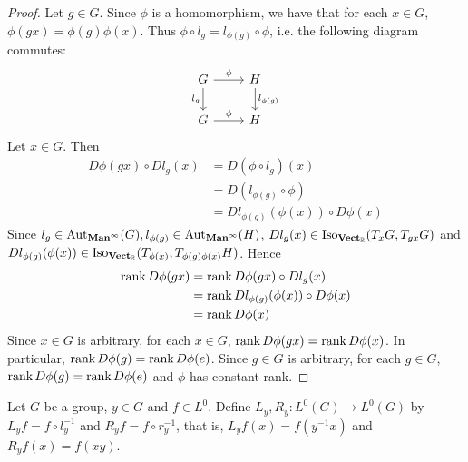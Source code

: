 \documentclass{book}
\begin{document}
\begin{proof}
	Let $g \in G$. Since $\phi$ is a homomorphism, we have that for each $x \in G$, $\phi(g x) = \phi(g) \phi(x)$. Thus $\phi \circ l_g = l_{\phi(g)} \circ \phi$, i.e. the following diagram commutes: 
	\[ 
	\begin{tikzcd}
		G \arrow[r, "\phi"] \arrow[d, "l_g"'] & H \arrow[d, "l_{\phi(g)}"]  \\
		G \arrow[r, "\phi"]                   & H
	\end{tikzcd}
	\]
	Let $x \in G$. Then
	\begin{align*}
		D\phi(gx) \circ D l_g (x) 
		& = D(\phi \circ l_g) (x) \\
		& = D(l_{\phi(g)} \circ \phi) \\
		& = D l_{\phi(g)} (\phi(x)) \circ D \phi (x) 
	\end{align*}
	Since $l_g \in \operatorname{Aut}_{\operatorname*{\text{\textbf{Man}}^{\infty}}}(G), l_{\phi(g)} \in \operatorname{Aut}_{\operatorname*{\text{\textbf{Man}}^{\infty}}}(H)$, $D l_g (x) \in \operatorname{Iso}_{\operatorname*{\text{\textbf{Vect}}_{\mathbb{R}}}}(T_x G, T_{g x} G)$ and $D l_{\phi(g)}(\phi(x)) \in \operatorname{Iso}_{\operatorname*{\text{\textbf{Vect}}_{\mathbb{R}}}}(T_{\phi(x)}, T_{\phi(g) \phi(x)}H)$. Hence 
	\begin{align*}
		\operatorname{\text{rank}} D\phi(gx)
		& = \operatorname{\text{rank}} D\phi(gx) \circ D l_g (x) \\
		& = \operatorname{\text{rank}} D l_{\phi(g)} (\phi(x)) \circ D \phi (x) \\
		& = \operatorname{\text{rank}}  D \phi (x)
	\end{align*} 
	Since $x \in G$ is arbitrary, for each $x \in G$, $\operatorname{\text{rank}} D\phi(gx) = \operatorname{\text{rank}}  D \phi (x)$. In particular, $\operatorname{\text{rank}} D\phi(g) = \operatorname{\text{rank}}  D \phi (e)$. Since $g \in G$ is arbitrary, for each $g \in G$, $\operatorname{\text{rank}} D\phi(g) = \operatorname{\text{rank}}  D \phi (e)$ and $\phi$ has constant rank. 
\end{proof}




























\begin{ex}
	
\end{ex}

\begin{defn}  
	Let $G$ be a group, $y \in G$ and $f \in L^0$.  Define $L_y, R_y: L^0(G) \rightarrow L^0(G)$ by $L_y f = f \circ l_y^{-1}$ and $R_y f = f \circ r_y^{-1}$, that is, $L_yf(x) = f(y^{-1}x)$ and $R_yf(x) = f(xy)$.
\end{defn}
\end{document}
